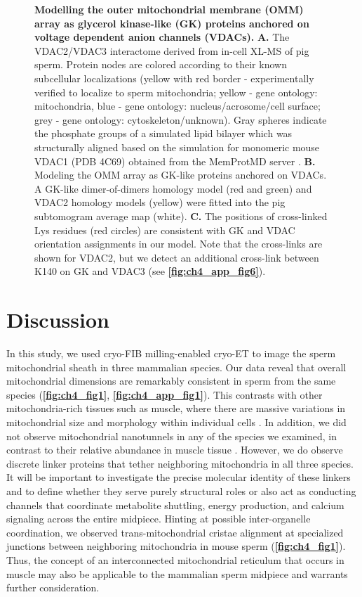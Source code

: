 \addtocounter{figure}{-1}
\begin{figure}[ht]
	\caption{\textbf{Modelling the outer mitochondrial membrane (OMM) array as glycerol kinase-like (GK) proteins anchored on voltage dependent anion channels (VDACs).} \textbf{A.} The VDAC2/VDAC3 interactome derived from in-cell XL-MS of pig sperm. Protein nodes are colored according to their known subcellular localizations (yellow with red border - experimentally verified to localize to sperm mitochondria; yellow - gene ontology: mitochondria, blue - gene ontology: nucleus/acrosome/cell surface; grey - gene ontology: cytoskeleton/unknown). Gray spheres indicate the phosphate groups of a simulated lipid bilayer which was structurally aligned based on the simulation for  monomeric mouse VDAC1 (PDB 4C69) obtained from the MemProtMD server \cite{Newport2019}. \textbf{B.} Modeling the OMM array as GK-like proteins anchored on VDACs. A GK-like dimer-of-dimers homology model (red and green) and VDAC2 homology models (yellow) were fitted into the pig subtomogram average map (white). \textbf{C.} The positions of cross-linked Lys residues (red circles) are consistent with GK and VDAC orientation assignments in our model. Note that the cross-links are shown for VDAC2, but we detect an additional cross-link between K140 on GK and VDAC3 (see \textbf{\autoref{fig:ch4_app_fig6}}).}
\end{figure}
%
\section{Discussion}
In this study, we used cryo-FIB milling-enabled cryo-ET to image the sperm mitochondrial sheath in three mammalian species. Our data reveal that overall mitochondrial dimensions are remarkably consistent in sperm from the same species (\textbf{\autoref{fig:ch4_fig1}}, \textbf{\autoref{fig:ch4_app_fig1}}). This contrasts with other mitochondria-rich tissues such as muscle, where there are massive variations in mitochondrial size and morphology within individual cells \cite{Vincent2019}. In addition, we did not observe mitochondrial nanotunnels in any of the species we examined, in contrast to their relative abundance in muscle tissue \cite{Vincent2017, Vincent2019}. However, we do observe discrete linker proteins that tether neighboring mitochondria in all three species. It will be important to investigate the precise molecular identity of these linkers and to define whether they serve purely structural roles or also act as conducting channels that coordinate metabolite shuttling, energy production, and calcium signaling across the entire midpiece. Hinting at possible inter-organelle coordination, we observed trans-mitochondrial cristae alignment at specialized junctions between neighboring mitochondria in mouse sperm (\textbf{\autoref{fig:ch4_fig1}}). Thus, the concept of an interconnected mitochondrial reticulum that occurs in muscle \cite{Glancy2015} may also be applicable to the ma\-mmalian sperm midpiece and warrants further consideration.

